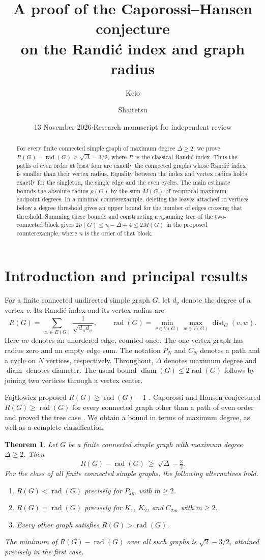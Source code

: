 \documentclass[11pt,a4paper]{article}
\title{A proof of the Caporossi--Hansen conjecture\\on the Randi\'c index and graph radius}
\author{Keio \and Shaitetsu}
\date{13 November 2026\quad$\cdot$\quad Research manuscript for independent review}
\newtheorem{theorem}{Theorem}[section]
\newcommand{\rad}{\operatorname{rad}}
\newcommand{\diam}{\operatorname{diam}}
\newcommand{\dist}{\operatorname{dist}}
\begin{document}
\maketitle
\begin{abstract}
For every finite connected simple graph of maximum degree $\Delta\ge2$,
we prove $R(G)-\rad(G)\ge\sqrt{\Delta}-3/2$, where $R$ is the classical
Randi\'c index. Thus the paths of even order at least four are exactly
the connected graphs whose Randi\'c index is smaller than their vertex
radius. Equality between the index and vertex radius holds exactly for the singleton, the single edge and
the even cycles. The main estimate bounds the absolute radius $\rho(G)$
by the sum $M(G)$ of reciprocal maximum endpoint degrees. In a minimal counterexample,
deleting the leaves attached to vertices below a degree threshold gives
an upper bound for the number of edges crossing that threshold. Summing
these bounds and constructing a spanning tree of the two-connected block
gives $2\rho(G)\le n-\Delta+4\le2M(G)$ in the proposed counterexample,
where $n$ is the order of that block.
\end{abstract}

\section{Introduction and principal results}
For a finite connected undirected simple graph $G$, let $d_v$ denote the
degree of a vertex $v$. Its Randi\'c index and its vertex radius are
\[
 R(G)=\sum_{uv\in E(G)}\frac{1}{\sqrt{d_ud_v}},\qquad
 \rad(G)=\min_{v\in V(G)}\max_{w\in V(G)}\dist_G(v,w).
\]
Here $uv$ denotes an unordered edge, counted once. The one-vertex graph
has radius zero and an empty edge sum. The notation $P_N$ and $C_N$
denotes a path and a cycle on $N$ vertices, respectively. Throughout,
$\Delta$ denotes maximum degree and $\diam$ denotes diameter. The usual
bound $\diam(G)\le2\rad(G)$ follows by joining two vertices through a
vertex center.

Fajtlowicz proposed $R(G)\ge\rad(G)-1$ \cite{Faj}. Caporossi and Hansen
conjectured $R(G)\ge\rad(G)$ for every connected graph other than a
path of even order and proved the tree case \cite{CH,Zuo}. We obtain a
bound in terms of maximum degree, as well as a complete classification.
\begin{theorem}\label{thm:main}
Let $G$ be a finite connected simple graph with maximum degree $\Delta\ge2$.
Then
\begin{equation}\label{eq:main}
 R(G)-\rad(G)\ \ge\ \sqrt{\Delta}-\tfrac32.
\end{equation}
For the class of all finite connected simple graphs, the following alternatives hold.
\begin{enumerate}
\item $R(G)<\rad(G)$ precisely for $P_{2m}$ with $m\ge2$.
\item $R(G)=\rad(G)$ precisely for $K_1$, $K_2$, and $C_{2m}$ with $m\ge2$.
\item Every other graph satisfies $R(G)>\rad(G)$.
\end{enumerate}
The minimum of $R(G)-\rad(G)$ over all such graphs is $\sqrt2-3/2$,
attained precisely in the first case.
\end{theorem}
\end{document}

